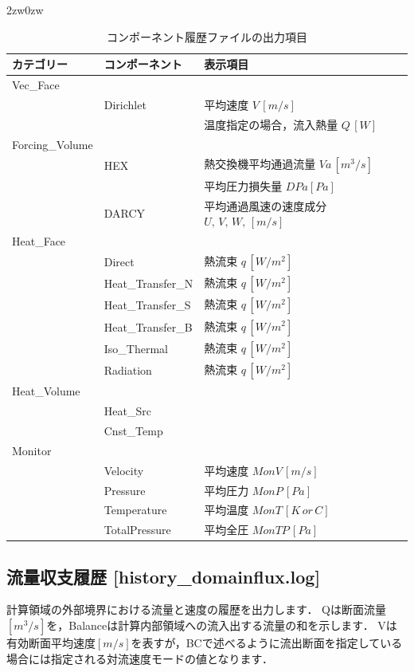 \begin{indentation}{2zw}{0zw}
\begin{table}[htdp]
\caption{コンポーネント履歴ファイルの出力項目}
\begin{center}
\small
\begin{tabular}{lll} \toprule
カテゴリー & コンポーネント & 表示項目\\ \midrule
Vec\_Face & &\\
& Dirichlet & 平均速度 $V\,[m/s]$\\
& & 温度指定の場合，流入熱量 $Q\,[W]$\\
Forcing\_Volume & &\\
& HEX & 熱交換機平均通過流量 $Va\,[m^3/s]$\\
& & 平均圧力損失量 $DPa [Pa]$\\
& DARCY & 平均通過風速の速度成分 $U,\,V,\,W,\,[m/s]$\\
Heat\_Face & &\\
& Direct & 熱流束 $q\,[W/m^2]$\\
& Heat\_Transfer\_N & 熱流束 $q\,[W/m^2]$\\
& Heat\_Transfer\_S & 熱流束 $q\,[W/m^2]$\\
& Heat\_Transfer\_B & 熱流束 $q\,[W/m^2]$\\
& Iso\_Thermal & 熱流束 $q\,[W/m^2]$\\
& Radiation & 熱流束 $q\,[W/m^2]$\\
Heat\_Volume & &\\
& Heat\_Src &\\
& Cnst\_Temp &\\
Monitor & &\\
& Velocity & 平均速度 $MonV\,[m/s]$\\
& Pressure & 平均圧力 $MonP\,[Pa]$\\
& Temperature & 平均温度 $MonT\,[K\,or\,C]$\\
& TotalPressure & 平均全圧 $MonTP\,[Pa]$\\
\bottomrule
\end{tabular}
\end{center}
\label{tbl:monitor-display}
\end{table}

\end{indentation}

%
\pagebreak
\subsection{流量収支履歴 [history\_domainflux.log]}
計算領域の外部境界における流量と速度の履歴を出力します．
Qは断面流量$[m^3/s]$を，Balanceは計算内部領域への流入出する流量の和を示します．
Vは有効断面平均速度$[m/s]$を表すが，BCで述べるように流出断面を指定している場合には指定される対流速度モードの値となります．

